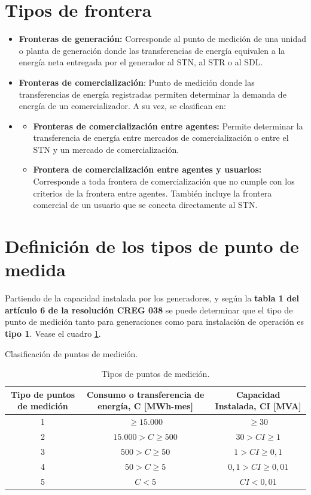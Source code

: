 \section{Tipos de frontera}
\begin{itemize}
  \item \textbf{Fronteras de generación:} Corresponde al punto de medición de una unidad o planta de generación donde las transferencias de energía equivalen a la energía neta entregada por el generador al STN, al STR o al SDL.
  \item \textbf{Fronteras de comercialización}: Punto de medición donde las transferencias de energía registradas permiten determinar la demanda de energía de un comercializador. A su vez, se clasifican en:
  \item \begin{itemize}
    \item \textbf{Fronteras de comercialización entre agentes:} Permite determinar la transferencia de energía entre mercados de comercialización o entre el STN y un mercado de comercialización.
    \item \textbf{Frontera de comercialización entre agentes y usuarios:}  Corresponde a toda frontera de comercialización que no cumple con los criterios de la frontera entre agentes. También incluye la frontera comercial de un usuario que se conecta directamente al STN.
  \end{itemize}
\end{itemize}


\section{Definición de los tipos de punto de medida}

Partiendo de la capacidad instalada por los generadores, y según la \textbf{tabla 1 del artículo 6 de la resolución CREG 038} se puede determinar que el tipo de punto de medición tanto para generaciones como para instalación de operación es \textbf{tipo 1}. Vease el cuadro \ref{tab:clasificacion_puntos_medicion}.


\begin{table}[t]
  \centering
  \caption{Clasificación de puntos de medición.}
  \label{tab:clasificacion_puntos_medicion}
  \begin{tabular}{ccc}
    \toprule
    \textbf{Tipo de puntos de medición} & \textbf{Consumo o transferencia de energía, C [MWh-mes]} & \textbf{Capacidad Instalada, CI [MVA]} \\
    \midrule
    1 & $\ge 15.000$ \cellcolor{lightgreen} & $\ge 30$ \cellcolor{lightgreen} \\
    2 & $15.000 > C \ge 500$ & $30 > CI \ge 1$ \\
    3 & $500 > C \ge 50$ \cellcolor{lightred} & $1 > CI \ge 0,1$ \cellcolor{lightred} \\
    4 & $50 > C \ge 5$ & $0,1 > CI \ge 0,01$ \\
    5 & $C < 5$ & $CI < 0,01$ \\
    \bottomrule
  \end{tabular}
  \caption*{Tipos de puntos de medición.}
\end{table}


